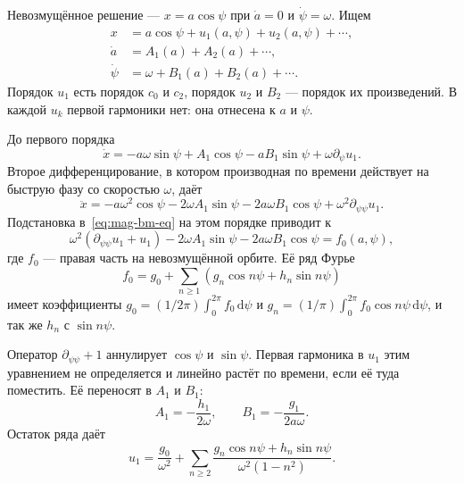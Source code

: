 \documentclass[aps,pra,preprint,a4paper,amsmath,amssymb,longbibliography]{revtex4-2}
\begin{document}
Невозмущённое решение --- $x=a\cos\psi$ при $\dot a=0$ и $\dot\psi=\omega$. Ищем
\begin{align}
x&=a\cos\psi+u_1(a,\psi)+u_2(a,\psi)+\cdots,
\label{eq:mag-bm-ansatz}\\
\dot a&=A_1(a)+A_2(a)+\cdots,
\label{eq:mag-bm-adot}\\
\dot\psi&=\omega+B_1(a)+B_2(a)+\cdots.
\label{eq:mag-bm-psidot}
\end{align}
Порядок $u_1$ есть порядок $c_0$ и $c_2$, порядок $u_2$ и $B_2$ --- порядок их произведений. В каждой $u_k$ первой гармоники нет: она отнесена к $a$ и $\psi$.

До первого порядка
\begin{equation}
\label{eq:mag-bm-xdot}
\dot x=-a\omega\sin\psi
+A_1\cos\psi-a B_1\sin\psi+\omega\partial_\psi u_1.
\end{equation}
Второе дифференцирование, в котором производная по времени действует на быструю фазу со скоростью $\omega$, даёт
\begin{equation}
\label{eq:mag-bm-xddot}
\ddot x=-a\omega^2\cos\psi
-2\omega A_1\sin\psi-2a\omega B_1\cos\psi
+\omega^2\partial_{\psi\psi}u_1.
\end{equation}
Подстановка в~\eqref{eq:mag-bm-eq} на этом порядке приводит к
\begin{equation}
\label{eq:mag-bm-order1}
\omega^2(\partial_{\psi\psi}u_1+u_1)
-2\omega A_1\sin\psi-2a\omega B_1\cos\psi
=f_0(a,\psi),
\end{equation}
где $f_0$ --- правая часть на невозмущённой орбите. Её ряд Фурье
\begin{equation}
\label{eq:mag-bm-fourier}
f_0=g_0+\sum_{n\ge 1}(g_n\cos n\psi+h_n\sin n\psi)
\end{equation}
имеет коэффициенты $g_0=(1/2\pi)\int_0^{2\pi}f_0\,\mathrm{d}\psi$ и $g_n=(1/\pi)\int_0^{2\pi}f_0\cos n\psi\,\mathrm{d}\psi$, и так же $h_n$ с $\sin n\psi$.

Оператор $\partial_{\psi\psi}+1$ аннулирует $\cos\psi$ и $\sin\psi$. Первая гармоника в $u_1$ этим уравнением не определяется и линейно растёт по времени, если её туда поместить. Её переносят в $A_1$ и $B_1$:
\begin{equation}
\label{eq:mag-bm-AB}
A_1=-\frac{h_1}{2\omega},\qquad
B_1=-\frac{g_1}{2a\omega}.
\end{equation}
Остаток ряда даёт
\begin{equation}
\label{eq:mag-bm-u1}
u_1=\frac{g_0}{\omega^2}
+\sum_{n\ge 2}\frac{g_n\cos n\psi+h_n\sin n\psi}{\omega^2(1-n^2)}.
\end{equation}
\end{document}

